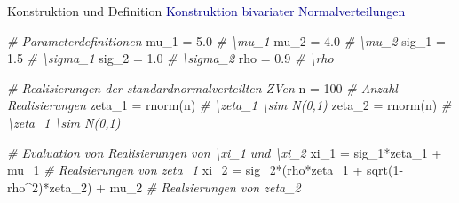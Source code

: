 \documentclass[
  8pt,
  ignorenonframetext,
]{beamer}
\newenvironment{Shaded}{\begin{snugshade}}{\end{snugshade}}
\newcommand{\CommentTok}[1]{\textcolor[rgb]{0.56,0.35,0.01}{\textit{#1}}}
\newcommand{\DecValTok}[1]{\textcolor[rgb]{0.00,0.00,0.81}{#1}}
\newcommand{\FloatTok}[1]{\textcolor[rgb]{0.00,0.00,0.81}{#1}}
\newcommand{\FunctionTok}[1]{\textcolor[rgb]{0.00,0.00,0.00}{#1}}
\newcommand{\NormalTok}[1]{#1}
\newcommand{\OtherTok}[1]{\textcolor[rgb]{0.56,0.35,0.01}{#1}}
\newcommand{\SpecialCharTok}[1]{\textcolor[rgb]{0.00,0.00,0.00}{#1}}
\begin{document}
\begin{frame}[fragile]{Konstruktion und Definition}
\protect\hypertarget{konstruktion-und-definition-3}{}
\textcolor{darkblue}{Konstruktion bivariater Normalverteilungen}

\tiny

\begin{Shaded}
\begin{Highlighting}[]
\CommentTok{\# Parameterdefinitionen}
\NormalTok{mu\_1   }\OtherTok{=} \FloatTok{5.0}                                              \CommentTok{\# \textbackslash{}mu\_1}
\NormalTok{mu\_2   }\OtherTok{=} \FloatTok{4.0}                                              \CommentTok{\# \textbackslash{}mu\_2}
\NormalTok{sig\_1  }\OtherTok{=} \FloatTok{1.5}                                              \CommentTok{\# \textbackslash{}sigma\_1    }
\NormalTok{sig\_2  }\OtherTok{=} \FloatTok{1.0}                                              \CommentTok{\# \textbackslash{}sigma\_2}
\NormalTok{rho    }\OtherTok{=} \FloatTok{0.9}                                              \CommentTok{\# \textbackslash{}rho}

\CommentTok{\# Realisierungen der standardnormalverteilten ZVen}
\NormalTok{n      }\OtherTok{=} \DecValTok{100}                                              \CommentTok{\# Anzahl Realisierungen}
\NormalTok{zeta\_1 }\OtherTok{=} \FunctionTok{rnorm}\NormalTok{(n)                                         }\CommentTok{\# \textbackslash{}zeta\_1 \textbackslash{}sim N(0,1)  }
\NormalTok{zeta\_2 }\OtherTok{=} \FunctionTok{rnorm}\NormalTok{(n)                                         }\CommentTok{\# \textbackslash{}zeta\_1 \textbackslash{}sim N(0,1)}

\CommentTok{\# Evaluation von Realisierungen von \textbackslash{}xi\_1 und \textbackslash{}xi\_2}
\NormalTok{xi\_1   }\OtherTok{=}\NormalTok{ sig\_1}\SpecialCharTok{*}\NormalTok{zeta\_1 }\SpecialCharTok{+}\NormalTok{ mu\_1                              }\CommentTok{\# Realsierungen von zeta\_1  }
\NormalTok{xi\_2   }\OtherTok{=}\NormalTok{ sig\_2}\SpecialCharTok{*}\NormalTok{(rho}\SpecialCharTok{*}\NormalTok{zeta\_1 }\SpecialCharTok{+} \FunctionTok{sqrt}\NormalTok{(}\DecValTok{1}\SpecialCharTok{{-}}\NormalTok{rho}\SpecialCharTok{\^{}}\DecValTok{2}\NormalTok{)}\SpecialCharTok{*}\NormalTok{zeta\_2) }\SpecialCharTok{+}\NormalTok{ mu\_2 }\CommentTok{\# Realsierungen von zeta\_2  }



\end{Highlighting}
\end{Shaded}
\end{frame}
\end{document}
